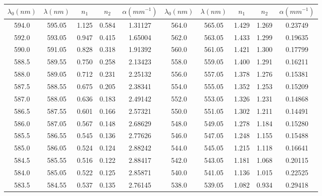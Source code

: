 \documentclass{thureport}
\begin{document}
\begin{table}[H]
    \centering
      \begin{tabular}{|c|c|c|c|c|c|c|c|c|c|}
      \hline
      $\lambda_0(nm)$ & $\lambda(nm)$ & $n_1$   & $n_2$   & $\alpha(mm^{-1})$ & $\lambda_0(nm)$ & $\lambda(nm)$ & $n_1$   & $n_2$   & $\alpha(mm^{-1})$ \bigstrut\\
      \hline
      594.0  & 595.05  & 1.125  & 0.584  & 1.31127  & 564.0  & 565.05  & 1.429  & 1.269  & 0.23749  \bigstrut\\
    \hline
    592.0  & 593.05  & 0.947  & 0.415  & 1.65004  & 562.0  & 563.05  & 1.433  & 1.299  & 0.19635  \bigstrut\\
    \hline
    590.0  & 591.05  & 0.828  & 0.318  & 1.91392  & 560.0  & 561.05  & 1.421  & 1.300  & 0.17799  \bigstrut\\
    \hline
    588.5  & 589.55  & 0.750  & 0.258  & 2.13423  & 558.0  & 559.05  & 1.400  & 1.291  & 0.16211  \bigstrut\\
    \hline
    588.0  & 589.05  & 0.712  & 0.231  & 2.25132  & 556.0  & 557.05  & 1.378  & 1.276  & 0.15381  \bigstrut\\
    \hline
    587.5  & 588.55  & 0.675  & 0.205  & 2.38341  & 554.0  & 555.05  & 1.352  & 1.253  & 0.15209  \bigstrut\\
    \hline
    587.0  & 588.05  & 0.636  & 0.183  & 2.49142  & 552.0  & 553.05  & 1.326  & 1.231  & 0.14868  \bigstrut\\
    \hline
    586.5  & 587.55  & 0.601  & 0.166  & 2.57321  & 550.0  & 551.05  & 1.302  & 1.211  & 0.14491  \bigstrut\\
    \hline
    586.0  & 587.05  & 0.567  & 0.148  & 2.68629  & 548.0  & 549.05  & 1.278  & 1.184  & 0.15280  \bigstrut\\
    \hline
    585.5  & 586.55  & 0.545  & 0.136  & 2.77626  & 546.0  & 547.05  & 1.248  & 1.155  & 0.15488  \bigstrut\\
    \hline
    585.0  & 586.05  & 0.524  & 0.124  & 2.88242  & 544.0  & 545.05  & 1.215  & 1.118  & 0.16641  \bigstrut\\
    \hline
    584.5  & 585.55  & 0.516  & 0.122  & 2.88417  & 542.0  & 543.05  & 1.181  & 1.068  & 0.20115  \bigstrut\\
    \hline
    584.0  & 585.05  & 0.522  & 0.125  & 2.85871  & 540.0  & 541.05  & 1.136  & 1.015  & 0.22525  \bigstrut\\
    \hline
    583.5  & 584.55  & 0.537  & 0.135  & 2.76145  & 538.0  & 539.05  & 1.082  & 0.934  & 0.29418  \bigstrut\\

\end{tabular}
\end{table}
\end{document}
